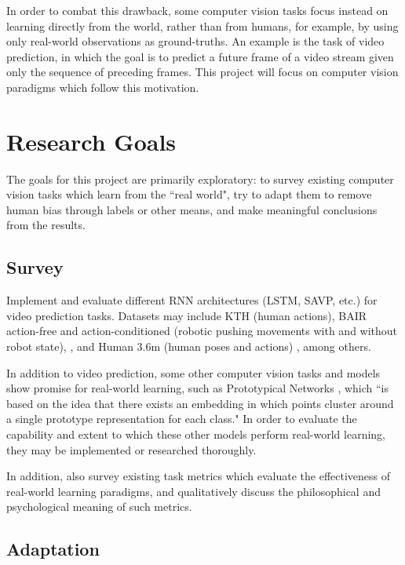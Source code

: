 \documentclass[10pt, letterpaper]{article}
\begin{document}
In order to combat this drawback, some computer vision tasks focus instead on
learning directly from the world, rather than from humans, for example, by
using only real-world observations as ground-truths. An example is the task of
video prediction, in which the goal is to predict a future frame of a video
stream given only the sequence of preceding frames.
\cite{video_prediction_survey} This project will focus on computer vision
paradigms which follow this motivation.

\section{Research Goals}

The goals for this project are primarily exploratory: to survey existing
computer vision tasks which learn from the ``real world", try to adapt them to
remove human bias through labels or other means, and make meaningful
conclusions from the results.

\subsection{Survey}

Implement and evaluate different RNN architectures (LSTM, SAVP, etc.) for video
prediction tasks. Datasets may include KTH \cite{kth} (human actions), BAIR
action-free and action-conditioned (robotic pushing movements with and without
robot state), \cite{savp}, and Human 3.6m (human poses and actions)
\cite{humans3_6}, among others.

In addition to video prediction, some other computer vision tasks and models
show promise for real-world learning, such as Prototypical Networks
\cite{prototypical}, which ``is based on the idea that there exists an
embedding in which points cluster around a single prototype representation for
each class." In order to evaluate the capability and extent to which these
other models perform real-world learning, they may be implemented or researched
thoroughly.

In addition, also survey existing task metrics which evaluate the effectiveness
of real-world learning paradigms, and qualitatively discuss the philosophical
and psychological meaning of such metrics.

\subsection{Adaptation}
\end{document}
